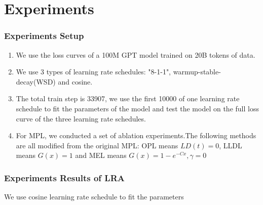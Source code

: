 \documentclass[aspectratio=169]{beamer}
\begin{document}
    \section{Experiments}\label{sec:experiments}

    \begin{frame}
        \frametitle{Experiments Setup}
        \begin{enumerate}
            \item We use the loss curves of a 100M GPT model trained on
            20B tokens of data.
            \item We use 3 types of learning rate schedules: "8-1-1",
            warmup-stable-decay(WSD) and cosine.
            \item The total train step is 33907, we use the first 10000
            of one learning rate schedule to fit the parameters of
            the model and test the model on the full loss curve of
            the three learning rate schedules.
            \item For MPL, we conducted a set of ablation experiments.The following methods are all
            modified from the original MPL: OPL means $LD(t)=0$, LLDL means $G(x)=1$ and MEL means $G(x) = 1-e^{-Cx},\gamma = 0$
        \end{enumerate}
    \end{frame}

    \begin{frame}
        \frametitle{Experiments Results of LRA}
        We use cosine learning rate schedule to fit the parameters
        \begin{figure}
            \centering
            \label{fig:figure}
        \end{figure}
    \end{frame}
\end{document}
